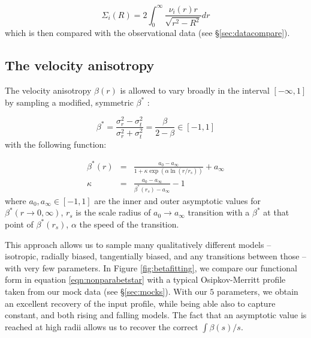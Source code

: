 \begin{equation}
\Sigma_i(R) = 2\int_0^\infty \frac{\nu_i(r) r}{\sqrt{r^2 - R^2}}dr
\end{equation}
which is then compared with the observational data (see
\S\ref{sec:datacompare}).

\subsection{The velocity anisotropy}

The velocity anisotropy $\beta(r)$ is allowed to vary broadly in the interval
$[-\infty, 1]$ by sampling a modified, symmetric $\beta^*$
\citep[e.g.][]{2006MNRAS.367..387R}:

\begin{equation}\label{eqn:betastar}
    \beta^* = \frac{\sigma_r^2-\sigma_t^2}{\sigma_r^2+\sigma_t^2} = \frac{\beta}{2-\beta} \in [-1,1]
\end{equation}
with the following function:

\begin{eqnarray}
    \beta^*(r) &=& \frac{a_0-a_\infty}{1+\kappa \exp(\alpha\ln(r/r_s))}+a_\infty\\
    \kappa &=& \frac{a_0-a_\infty}{\beta^*(r_s)-a_\infty}-1
    \label{eqn:nonparabetstar}
\end{eqnarray}
where $a_0, a_\infty \in[-1, 1]$ are the inner and outer asymptotic values for
$\beta^*(r\to 0,\infty)$, $r_s$ is the scale radius of $a_0\to a_\infty$
transition with a $\beta^*$ at that point of $\beta^*(r_s)$, $\alpha$ the speed
of the transition.

This approach allows us to sample many qualitatively different models --
isotropic, radially biased, tangentially biased, and any transitions between
those -- with very few parameters. In Figure \ref{fig:betafitting}, we compare
our functional form in equation \ref{eqn:nonparabetstar} with a typical
Osipkov-Merritt profile taken from our mock data (see \S\ref{sec:mocks}). With
our $5$ parameters, we obtain an excellent recovery of the input profile, while
being able also to capture constant, and both rising and falling models. The
fact that an asymptotic value is reached at high radii allows us to recover the
correct $\int \beta(s)/s$.

